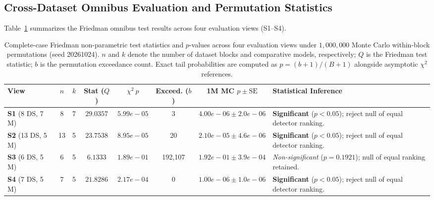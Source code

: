 \documentclass[11pt,a4paper]{article}
\begin{document}
\subsection{Cross-Dataset Omnibus Evaluation and Permutation Statistics}
Table~\ref{tab:friedman_stats} summarizes the Friedman omnibus test results across four evaluation views (S1--S4).

\begin{table}[htbp]
\centering\footnotesize\setlength{\tabcolsep}{2.5pt}
\caption{Complete-case Friedman non-parametric test statistics and $p$-values across four evaluation views under $1{,}000{,}000$ Monte Carlo within-block permutations (seed 20261024). $n$ and $k$ denote the number of dataset blocks and comparative models, respectively; $Q$ is the Friedman test statistic; $b$ is the permutation exceedance count. Exact tail probabilities are computed as $p = (b+1)/(B+1)$ alongside asymptotic $\chi^2$ references.}
\label{tab:friedman_stats}
\begin{tabularx}{\textwidth}{lcccccc>{\raggedright\arraybackslash}X}\toprule
\textbf{View} & \textbf{$n$} & \textbf{$k$} & \textbf{Stat ($Q$)} & $\chi^2\ p$ & \textbf{Exceed. ($b$)} & \textbf{1M MC $p \pm \text{SE}$} & \textbf{Statistical Inference} \\\midrule
\textbf{S1} (8 DS, 7 M) & 8 & 7 & $29.0357$ & $5.99e-05$ & 3 & $4.00e-06 \pm 2.0e-06$ & \textbf{Significant} ($p < 0.05$); reject null of equal detector ranking. \\
\textbf{S2} (13 DS, 5 M) & 13 & 5 & $23.7538$ & $8.95e-05$ & 20 & $2.10e-05 \pm 4.6e-06$ & \textbf{Significant} ($p < 0.05$); reject null of equal detector ranking. \\
\textbf{S3} (6 DS, 5 M) & 6 & 5 & $6.1333$ & $1.89e-01$ & 192,107 & $1.92e-01 \pm 3.9e-04$ & \textit{Non-significant} ($p = 0.1921$); null of equal ranking retained. \\
\textbf{S4} (7 DS, 5 M) & 7 & 5 & $21.8286$ & $2.17e-04$ & 0 & $1.00e-06 \pm 1.0e-06$ & \textbf{Significant} ($p < 0.05$); reject null of equal detector ranking. \\
\bottomrule
\end{tabularx}
\end{table}
\end{document}
